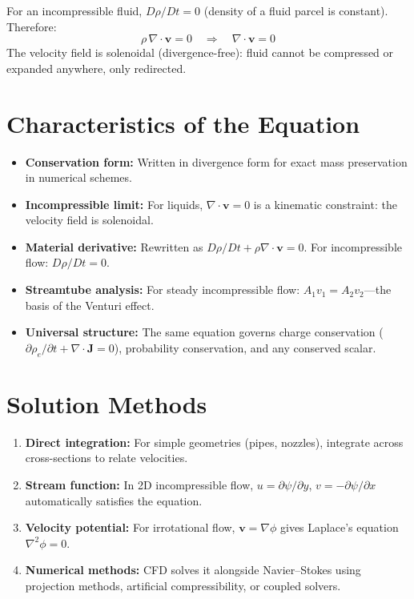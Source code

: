 \documentclass[11pt,openright]{book}
\begin{document}
For an incompressible fluid, $D\rho/Dt = 0$ (density of a fluid parcel is constant). Therefore:
\begin{equation}
\rho\,\nabla \cdot \mathbf{v} = 0 \quad\Longrightarrow\quad \boxed{\nabla \cdot \mathbf{v} = 0}
\end{equation}
The velocity field is solenoidal (divergence-free): fluid cannot be compressed or expanded anywhere, only redirected.

\section*{Characteristics of the Equation}

\begin{itemize}
\item \textbf{Conservation form:} Written in divergence form for exact mass preservation in numerical schemes.
\item \textbf{Incompressible limit:} For liquids, $\nabla \cdot \mathbf{v} = 0$ is a kinematic constraint: the velocity field is solenoidal.
\item \textbf{Material derivative:} Rewritten as $D\rho/Dt + \rho \nabla \cdot \mathbf{v} = 0$. For incompressible flow: $D\rho/Dt = 0$.
\item \textbf{Streamtube analysis:} For steady incompressible flow: $A_1 v_1 = A_2 v_2$---the basis of the Venturi effect.
\item \textbf{Universal structure:} The same equation governs charge conservation ($\partial \rho_e / \partial t + \nabla \cdot \mathbf{J} = 0$), probability conservation, and any conserved scalar.
\end{itemize}
\section*{Solution Methods}

\begin{enumerate}
\item \textbf{Direct integration:} For simple geometries (pipes, nozzles), integrate across cross-sections to relate velocities.
\item \textbf{Stream function:} In 2D incompressible flow, $u = \partial\psi/\partial y$, $v = -\partial\psi/\partial x$ automatically satisfies the equation.
\item \textbf{Velocity potential:} For irrotational flow, $\mathbf{v} = \nabla\phi$ gives Laplace's equation $\nabla^2 \phi = 0$.
\item \textbf{Numerical methods:} CFD solves it alongside Navier--Stokes using projection methods, artificial compressibility, or coupled solvers.
\end{enumerate}
\end{document}
